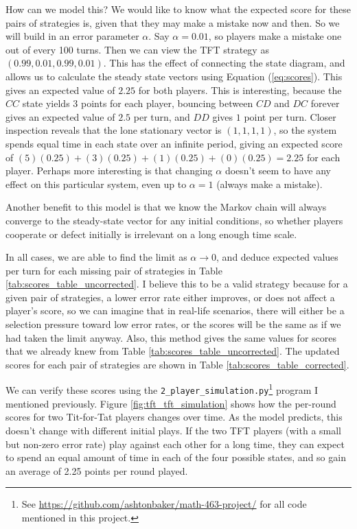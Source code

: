 \documentclass{article}
\begin{document}


How can we model this? We would like to know what the expected score for these pairs of strategies is, given that they may make a mistake now and then. So we will build in an error parameter \(\alpha\). Say \(\alpha = 0.01\), so players make a mistake one out of every 100 turns. Then we can view the TFT strategy as \((0.99, 0.01, 0.99, 0.01)\). This has the effect of connecting the state diagram, and allows us to calculate the steady state vectors using Equation (\ref{eq:scores}). This gives an expected value of \(2.25\) for both players. This is interesting, because the \(CC\) state yields 3 points for each player, bouncing between \(CD\) and \(DC\) forever gives an expected value of \(2.5\) per turn, and \(DD\) gives \(1\) point per turn. Closer inspection reveals that the lone stationary vector is \((1, 1, 1, 1)\), so the system spends equal time in each state over an infinite period, giving an expected score of \((5)(0.25) + (3)(0.25) + (1)(0.25) + (0)(0.25) = 2.25\) for each player. Perhaps more interesting is that changing \(\alpha\) doesn't seem to have any effect on this particular system, even up to \(\alpha = 1\) (always make a mistake).

Another benefit to this model is that we know the Markov chain will always converge to the steady-state vector for any initial conditions, so whether players cooperate or defect initially is irrelevant on a long enough time scale. 

In all cases, we are able to find the limit as \(\alpha \rightarrow 0\), and deduce expected values per turn for each missing pair of strategies in Table \ref{tab:scores_table_uncorrected}. I believe this to be a valid strategy because for a given pair of strategies, a lower error rate either improves, or does not affect a player's score, so we can imagine that in real-life scenarios, there will either be a selection pressure toward low error rates, or the scores will be the same as if we had taken the limit anyway. Also, this method gives the same values for scores that we already knew from Table \ref{tab:scores_table_uncorrected}. The updated scores for each pair of strategies are shown in Table \ref{tab:scores_table_corrected}.

We can verify these scores using the \texttt{2\_player\_simulation.py}\footnote{See \url{https://github.com/ashtonbaker/math-463-project/} for all code mentioned in this project.} program I mentioned previously. Figure \ref{fig:tft_tft_simulation} shows how the per-round scores for two Tit-for-Tat players changes over time. As the model predicts, this doesn't change with different initial plays. If the two TFT players (with a small but non-zero error rate) play against each other for a long time, they can expect to spend an equal amount of time in each of the four possible states, and so gain an average of 2.25 points per round played.
\end{document}
